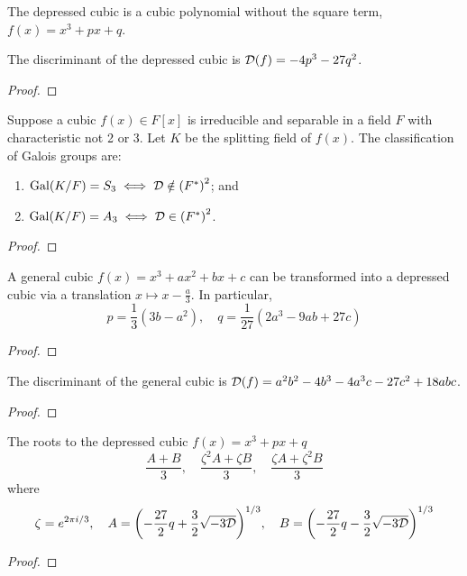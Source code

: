 \begin{definition}
    The depressed cubic is a cubic polynomial without the square term,
    \(f(x) = x^3 + px + q\).
\end{definition}
\begin{proposition}
    The discriminant of the depressed cubic is \(\mathcal{D}(f) = -4p^3 - 27q^2\).
\end{proposition}
\begin{proof}
\end{proof}
\begin{theorem}
    Suppose a cubic \(f(x) \in F[x]\) is irreducible and separable
    in a field \(F\) with characteristic not 2 or 3.
    Let \(K\) be the splitting field of \(f(x)\).
    The classification of Galois groups are:
    \begin{enumerate}[label={(\alph*)}, itemsep=0mm]
        \item \(\operatorname{Gal}(K/F) = S_3 \iff \mathcal{D} \notin {(F^\ast)}^2\); and
        \item \(\operatorname{Gal}(K/F) = A_3 \iff \mathcal{D} \in {(F^\ast)}^2\).
    \end{enumerate}
\end{theorem}
\begin{proof}
\end{proof}

\begin{lemma}
    A general cubic \(f(x) = x^3 + ax^2 + bx + c\)
    can be transformed into a depressed cubic
    via a translation \(x \mapsto x-\frac{a}{3}\).
    In particular,
    \begin{equation*}
        p = \frac{1}{3}(3b-a^2), \quad
        q = \frac{1}{27}(2a^3-9ab+27c)
    \end{equation*}
\end{lemma}
\begin{proof}
\end{proof}
\begin{proposition}
    The discriminant of the general cubic is
    \(\mathcal{D}(f) = a^2b^2 - 4b^3 - 4a^3c - 27c^2 + 18abc\).
\end{proposition}
\begin{proof}
\end{proof}
\begin{theorem}
    The roots to the depressed cubic \(f(x) = x^3 + px + q\)
    \begin{equation*}
        \frac{A+B}{3},\quad
        \frac{\zeta^2 A + \zeta B}{3},\quad
        \frac{\zeta A + \zeta^2 B}{3}
    \end{equation*}
    where
    \begin{equation*}
        \zeta = e^{2\pi i/3}, \quad
        A = \pqty{-\frac{27}{2}q + \frac{3}{2}\sqrt{-3\mca{D}}}^{1/3}, \quad
        B = \pqty{-\frac{27}{2}q - \frac{3}{2}\sqrt{-3\mca{D}}}^{1/3}
    \end{equation*}
\end{theorem}
\begin{proof}
\end{proof}

